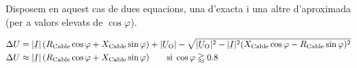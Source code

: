 Disposem en aquest cas de dues equacions, una d'exacta i una altre d'aproximada (per a valors elevats de $\cos \varphi$).

\begin{subequations}
\begin{align}
   \Delta U &= |\cmplx{I}| \,( R\ped{Cable} \cos \varphi + X\ped{Cable} \sin \varphi) + |\cmplx{U}\ped{O}| - \sqrt{|\cmplx{U}\ped{O}|^2 - |\cmplx{I}|^2 ( X\ped{Cable} \cos \varphi - R\ped{Cable} \sin \varphi )^2} \label{eq:cdt_trif_exact} \\
   \Delta U &\approx |\cmplx{I}| \,( R\ped{Cable} \cos \varphi + X\ped{Cable} \sin \varphi) \qquad \text{si} \; \cos \varphi \gtrapprox \num{0,8} \label{eq:cdt_trif_aprox}
\end{align}
\end{subequations}

